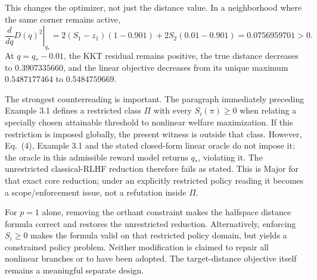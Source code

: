 \documentclass[10pt]{article}
\begin{document}
This changes the optimizer, not just the distance value. In a neighborhood where the same corner remains active, \[\left.\frac{d}{dq}D(q)^2\right|_{q_*}
 =2(S_1-z_1)(1-0.901)+2S_2(0.01-0.901)
 =0.0756959701>0.\] At \(q=q_*-0.01\), the KKT residual remains positive, the true distance decreases to \(0.3907335660\), and the linear objective decreases from its unique maximum \(0.5487177464\) to \(0.5484759669\).\par
The strongest counterreading is important. The paragraph immediately preceding Example 3.1 defines a restricted class \(\Pi\) with every \(S_i(\pi)\ge0\) when relating a specially chosen attainable threshold to nonlinear welfare maximization. If this restriction is imposed globally, the present witness is outside that class. However, Eq. (4), Example 3.1 and the stated closed-form linear oracle do not impose it; the oracle in this admissible reward model returns \(q_*\), violating it. The unrestricted classical-RLHF reduction therefore fails as stated. This is Major for that exact core reduction; under an explicitly restricted policy reading it becomes a scope/enforcement issue, not a refutation inside \(\Pi\).\par
For \(p=1\) alone, removing the orthant constraint makes the halfspace distance formula correct and restores the unrestricted reduction. Alternatively, enforcing \(S_i\ge0\) makes the formula valid on that restricted policy domain, but yields a constrained policy problem. Neither modification is claimed to repair all nonlinear branches or to have been adopted. The target-distance objective itself remains a meaningful separate design.\par
\end{document}
